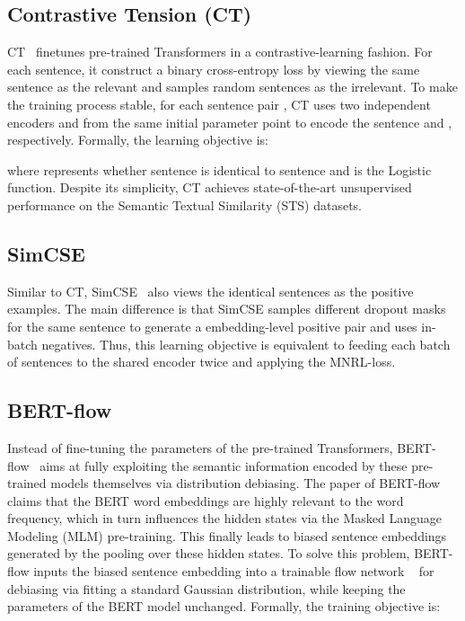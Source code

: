 \documentclass[11pt]{article}
\begin{document}
\subsection{Contrastive Tension (CT)}
CT~\citep{carlsson2021semantic} finetunes pre-trained Transformers in a contrastive-learning fashion. For each sentence, it construct a binary cross-entropy loss by viewing the same sentence as the relevant and samples  random sentences as the irrelevant.  To make the training process stable, for each sentence pair , CT uses two independent encoders  and  from the same initial parameter point to encode the sentence  and , respectively. Formally, the learning objective is:

where  represents whether sentence  is identical to sentence  and  is the Logistic function. Despite its simplicity, CT achieves state-of-the-art unsupervised performance on the Semantic Textual Similarity (STS) datasets.

\subsection{SimCSE}
Similar to CT, SimCSE~\citep{gao2021simcse} also views the identical sentences as the positive examples. The main difference is that SimCSE samples different dropout masks for the same sentence to generate a embedding-level positive pair and uses in-batch negatives. Thus, this learning objective is equivalent to feeding each batch of sentences to the shared encoder twice and applying the MNRL-loss. 

\subsection{BERT-flow}
Instead of fine-tuning the parameters of the pre-trained Transformers, BERT-flow~\citep{DBLP:conf/emnlp/LiZHWYL20} aims at fully exploiting the semantic information encoded by these pre-trained models themselves via distribution debiasing. The paper of BERT-flow claims that the BERT word embeddings are highly relevant to the word frequency, which in turn influences the hidden states via the Masked Language Modeling (MLM) pre-training. This finally leads to biased sentence embeddings generated by the pooling over these hidden states. To solve this problem, BERT-flow inputs the biased sentence embedding into a trainable flow network ~\citep{DBLP:conf/nips/KingmaD18} for debiasing via fitting a standard Gaussian distribution, while keeping the parameters of the BERT model unchanged. Formally, the training objective is:
\end{document}
